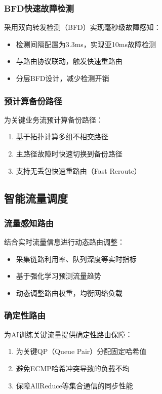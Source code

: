 \subsubsection{BFD快速故障检测}

采用双向转发检测（BFD）实现毫秒级故障感知：
\begin{itemize}
    \item 检测间隔配置为3.3ms，实现亚10ms故障检测
    \item 与路由协议联动，触发快速重路由
    \item 分层BFD设计，减少检测开销
\end{itemize}

\subsubsection{预计算备份路径}

为关键业务流预计算备份路径：
\begin{enumerate}
    \item 基于拓扑计算多组不相交路径
    \item 主路径故障时快速切换到备份路径
    \item 支持无丢包快速重路由（Fast Reroute）
\end{enumerate}

\subsection{智能流量调度}

\subsubsection{流量感知路由}

结合实时流量信息进行动态路由调整：
\begin{itemize}
    \item 采集链路利用率、队列深度等实时指标
    \item 基于强化学习预测流量趋势
    \item 动态调整路由权重，均衡网络负载
\end{itemize}

\subsubsection{确定性路由}

为AI训练关键流量提供确定性路由保障：
\begin{enumerate}
    \item 为关键QP（Queue Pair）分配固定哈希值
    \item 避免ECMP哈希冲突导致的负载不均
    \item 保障AllReduce等集合通信的同步性能
\end{enumerate}

